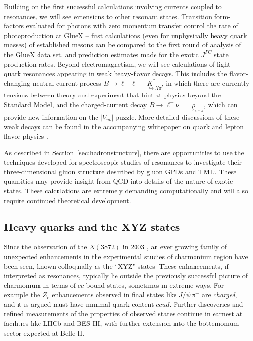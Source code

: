 Building on the first successful calculations involving currents coupled to resonances, we will see extensions to other resonant states. Transition form-factors evaluated for photons with zero momentum transfer control the rate of photoproduction at GlueX -- first calculations (even for unphysically heavy quark masses) of established mesons can be compared to the first round of analysis of the GlueX data set, and prediction estimates made for the exotic $J^{PC}$ state production rates. Beyond electromagnetism, we will see calculations of light quark resonances appearing in weak heavy-flavor decays. This includes the flavor-changing neutral-current process $B \to \ell^+\ell^- \!\!\!\! \underset{\;\;\;\;\;\hookrightarrow K\pi}{K^*}$, in which there are currently tensions between theory and experiment that hint at physics beyond the Standard Model, and the charged-current decay $B \to \ell^-\bar{\nu}  \!\!\!\!\!\!\!\!\;\;\underset{\;\;\;\;\;\;\hookrightarrow \pi\pi}{\rho}$, which can provide new information on the $|V_{ub}|$ puzzle. More detailed discussions of these weak decays can be found in
the accompanying whitepaper on quark and lepton flavor physics \cite{Lehner:2018qcd}.

As described in Section~\ref{sec:hadronstructure}, there are opportunities to use the techniques developed for spectroscopic studies of resonances to investigate their three-dimensional gluon structure described by gluon GPDs and TMD. These quantities may provide insight from QCD into details of the nature of exotic states. These calculations are extremely demanding computationally and will also require continued theoretical development.






\subsection{Heavy quarks and the XYZ states}

Since the  observation of the $X(3872)$ in 2003 \cite{Choi:2003ue}, an ever growing family of unexpected enhancements in the experimental studies of charmonium region have been seen, known colloquially as the ``XYZ'' states. These enhancements, if interpreted as resonances, typically lie outside the previously successful picture of charmonium in terms of $c\bar{c}$ bound-states, sometimes in extreme ways. For example the $Z_c$ enhancements observed in final states like $J/\psi \, \pi^+$ are \emph{charged}, and it is argued must have minimal quark content $c\bar{c} u \bar{d}$. Further discoveries and refined measurements of the properties of observed states continue in earnest at facilities like LHCb and BES III, with further extension into the bottomonium sector expected at Belle II.


